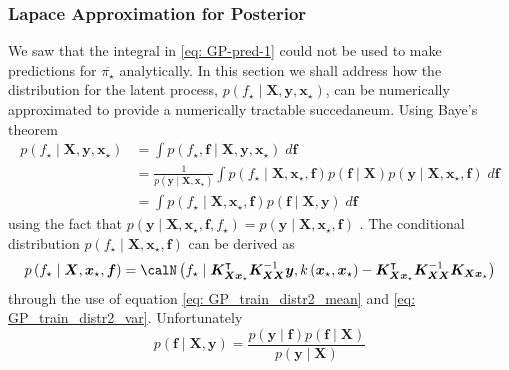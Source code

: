 \subsubsection{Lapace Approximation for Posterior}\label{Section1.6.2}

We saw that the integral in \ref{eq: GP-pred-1} could not be used to make predictions for $\overline{\pi_{\star}}$ analytically. In this section we shall address how the distribution for the latent process, $p \left( f_{\star} \mid \bm{X} , \bm{y} , \bm{x}_{\star} \right)$, can be numerically approximated to provide a numerically tractable succedaneum. Using Baye's theorem
\begin{align*}
    p \left( f_{\star} \mid \bm{X} , \bm{y} , \bm{x}_{\star} \right)
     & = \int p \left( f_{\star} , \bm{f} \mid \bm{X} , \bm{y} , \bm{x}_{\star} \right) \; d \bm{f}                                                                                                                                                       \\
     & = \frac{1}{p \left( \bm{y} \mid \bm{X} , \bm{x}_{\star} \right)} \int p \left( f_{\star} \mid \bm{X} , \bm{x}_{\star}, \bm{f} \right) p \left( \bm{f} \mid \bm{X} \right) p \left( \bm{y} \mid \bm{X} , \bm{x}_{\star}, \bm{f} \right) \; d \bm{f} \\
     & = \int p \left( f_{\star} \mid \bm{X} , \bm{x}_{\star}, \bm{f} \right) p \left( \bm{f} \mid \bm{X} , \bm{y} \right) \; d \bm{f}
\end{align*}
using the fact that $p \left( \bm{y} \mid \bm{X} , \bm{x}_{\star}, \bm{f}, f_{\star} \right) = p \left( \bm{y} \mid \bm{X} , \bm{x}_{\star}, \bm{f} \right)$ \cite{BishopChristopherM2006Pram, RasmussenCarlEdward2006Gpfm}. The conditional distribution $p \left( f_{\star} \mid \bm{X} , \bm{x}_{\star}, \bm{f} \right)$ can be derived as
\begin{equation*}
    p \left( f_{\star} \mid \bm{X} , \bm{x}_{\star}, \bm{f} \right) = \calN \left( f_{\star} \mid \bm{K}_{\bm{X} \bm{x}_{\star}}^{\intercal} \bm{K}_{\bm{X} \bm{X}}^{-1} \bm{y}, k \left( \bm{x}_{\star}, \bm{x}_{\star} \right) - \bm{K}_{\bm{X} \bm{x}_{\star}}^{\intercal} \bm{K}_{\bm{X} \bm{X}}^{-1} \bm{K}_{\bm{X} \bm{x}_{\star}} \right)
\end{equation*}
through the use of equation \ref{eq: GP_train_distr2_mean} and \ref{eq: GP_train_distr2_var}. Unfortunately
\begin{equation*}
    p \left( \bm{f} \mid \bm{X} , \bm{y} \right) = \frac{p \left( \bm{y} \mid \bm{f} \right) p \left( \bm{f} \mid \bm{X} \right) }{p \left( \bm{y} \mid \bm{X} \right)}
\end{equation*}
